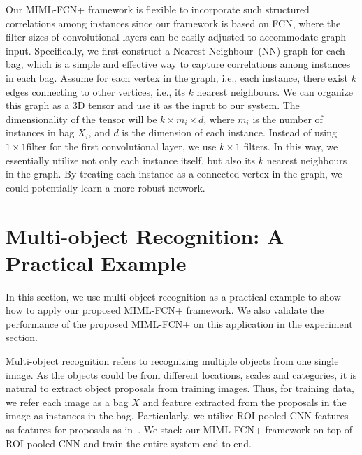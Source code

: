 \documentclass[10pt,twocolumn,letterpaper]{article}
\begin{document}
Our MIML-FCN+ framework is flexible to incorporate such structured
correlations among instances since our framework is based on FCN,
where the filter sizes of convolutional layers can be easily
adjusted to accommodate graph input. Specifically, we first
construct a Nearest-Neighbour~(NN) graph for each bag, which is a
simple and effective way to capture correlations among instances
in each bag. Assume for each vertex in the graph, i.e., each
instance, there exist $k$ edges connecting to other vertices,
i.e., its $k$ nearest neighbours. We can organize this graph as a
$3$D tensor and use it as the input to our system. The
dimensionality of the tensor will be $k \times m_i \times d$,
where $m_i$ is the number of instances in bag $X_i$, and $d$ is
the dimension of each instance. Instead of using $1\times 1$filter
for the first convolutional layer, we use $k\times 1$ filters. In
this way, we essentially utilize not only each instance itself,
but also its $k$ nearest neighbours in the graph. By treating each
instance as a connected vertex in the graph, we could potentially
learn a more robust network.


\section{Multi-object Recognition: A Practical Example}
\label{example} In this section, we use multi-object recognition
as a practical example to show how to apply our proposed MIML-FCN+
framework. We also validate the performance of the proposed
\textsc{MIML-FCN+} on this application in the experiment section.

Multi-object recognition refers to recognizing multiple objects
from one single image. As the objects could be from different
locations, scales and categories, it is natural to extract object
proposals from training images. Thus, for training data, we refer
each image as a bag $X$ and feature extracted from the proposals
in the image as instances in the bag. Particularly, we utilize
ROI-pooled CNN features as features for proposals as
in~\cite{Ren2015}. We stack our MIML-FCN+ framework on top of
ROI-pooled CNN and train the entire system end-to-end.
\end{document}
